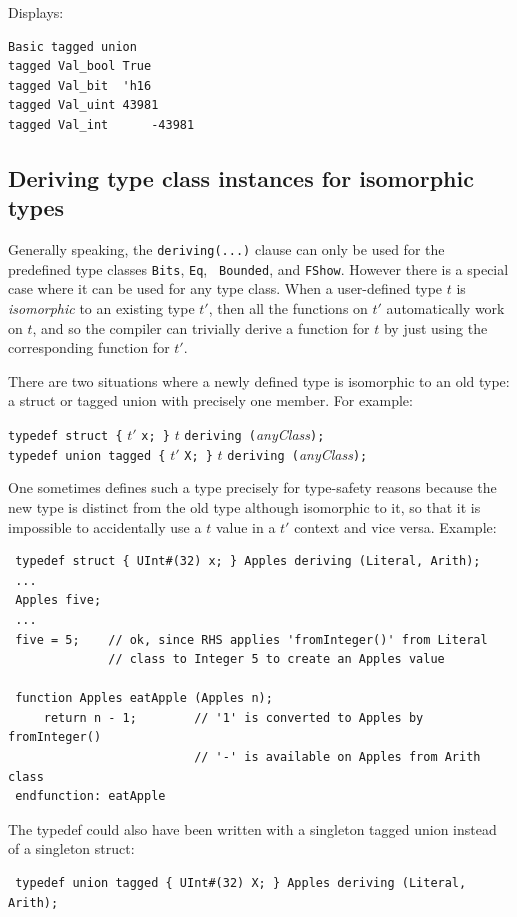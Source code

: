 \documentclass[twoside,letterpaper]{article}
\newcommand{\hm}{\hspace*{1em}}
\begin{document}
\begin{itemize}
Displays:

\begin{verbatim}
Basic tagged union
tagged Val_bool True
tagged Val_bit  'h16
tagged Val_uint 43981
tagged Val_int      -43981
\end{verbatim}

\end{itemize}


\subsection{Deriving type class instances for isomorphic types}

Generally speaking, the \texttt{deriving(...)} clause can only be used
for the predefined type classes \texttt{Bits}, \texttt{Eq}, {\tt
Bounded}, and {\tt FShow}.  However there is a special case where it can be used for
any type class.  When a user-defined type $t$ is \emph{isomorphic} to
an existing type $t'$, then all the functions on $t'$ automatically
work on $t$, and so the compiler can trivially derive a function for
$t$ by just using the corresponding function for $t'$.

There are two situations where a newly defined type is isomorphic to
an old type: a struct or tagged union with precisely one member. For
example:

\begin{tabbing}
\hm \texttt{typedef struct \{} $t'$ \texttt{x; \}} $t$ \texttt{deriving (}\emph{anyClass}\texttt{);} \\
\hm \texttt{typedef union tagged \{} $t'$ \texttt{X; \}} $t$ \texttt{deriving (}\emph{anyClass}\texttt{);} \\
\end{tabbing}

One sometimes defines such a type precisely for type-safety reasons
because the new type is distinct from the old type although isomorphic
to it, so that it is impossible to accidentally use a $t$ value in a
$t'$ context and vice versa.  Example:
\begin{verbatim}
 typedef struct { UInt#(32) x; } Apples deriving (Literal, Arith);
 ...
 Apples five;
 ...
 five = 5;    // ok, since RHS applies 'fromInteger()' from Literal
              // class to Integer 5 to create an Apples value

 function Apples eatApple (Apples n);
     return n - 1;        // '1' is converted to Apples by fromInteger()
                          // '-' is available on Apples from Arith class
 endfunction: eatApple
\end{verbatim}
The typedef could also have been written with a singleton tagged union
instead of a singleton struct:
\begin{verbatim}
 typedef union tagged { UInt#(32) X; } Apples deriving (Literal, Arith);
\end{verbatim}
\end{document}
